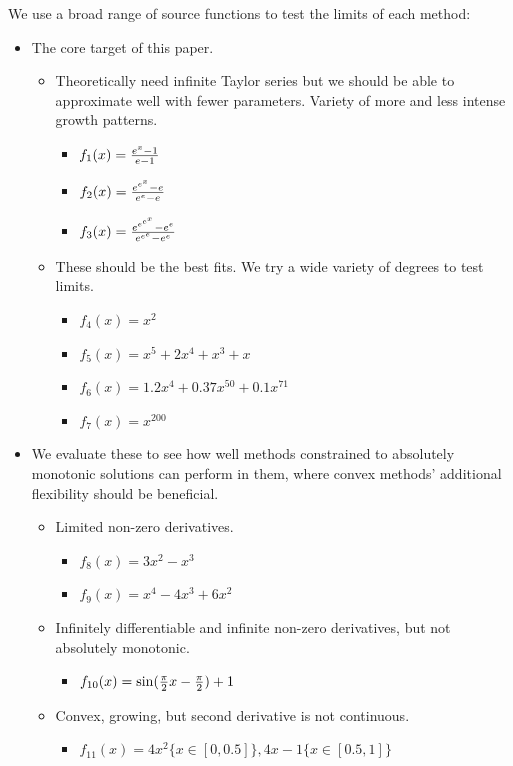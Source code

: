 \documentclass[12pt,a4paper]{article}
\begin{document}
We use a broad range of source functions to test the limits of each method:
\begin{itemize}
\item {} The core target of this paper.
\begin{itemize}
\item {} Theoretically need infinite Taylor series but we should be able to approximate well with fewer parameters. Variety of more and less intense growth patterns.
\begin{itemize}
\item $f_1(x) = {{e^x - 1} \over {e - 1}}$
\item $f_2(x) = {{e^{e^x} - e} \over {e^e - e}}$
\item $f_3(x) = {{e^{e^{e^x}} - e^e} \over {e^{e^{e}} - e^e}}$
\end{itemize}
\item {} These should be the best fits. We try a wide variety of degrees to test limits.
\begin{itemize}
\item $f_4(x) = x^2$
\item $f_5(x) = x^5+2x^4+x^3+x$
\item $f_6(x) = 1.2x^4+0.37x^{50}+0.1x^{71}$
\item $f_7(x) = x^{200}$
\end{itemize}
\end{itemize}
\item {} We evaluate these to see how well methods constrained to absolutely monotonic solutions can perform in them, where convex methods' additional flexibility should be beneficial.
\begin{itemize}
\item {} Limited non-zero derivatives.
\begin{itemize}
\item $f_8(x) = 3x^2 - x^3$
\item $f_9(x) = x^4 - 4x^3+6x^2$
\end{itemize}
\item {} Infinitely differentiable and infinite non-zero derivatives, but not absolutely monotonic.
\begin{itemize}
\item $f_{10}(x) = \sin({{\pi} \over 2}x - {{\pi} \over 2})+1$
\end{itemize}
\item {} Convex, growing, but second derivative is not continuous.
\begin{itemize}
\item $f_{11}(x) = 4x^2 \{x \in [0,0.5]\}, 4x - 1 \{x \in [0.5,1]\}$
\end{itemize}
\end{itemize}
\end{itemize}
\end{document}
